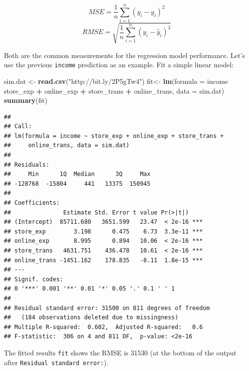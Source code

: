 \documentclass[12pt,]{krantz}
\makeatletter
\newenvironment{Shaded}{\begin{snugshade}}{\end{snugshade}}
\newcommand{\DataTypeTok}[1]{\textcolor[rgb]{0.27,0.27,0.27}{#1}}
\newcommand{\KeywordTok}[1]{\textcolor[rgb]{0.27,0.27,0.27}{\textbf{#1}}}
\newcommand{\NormalTok}[1]{#1}
\newcommand{\OperatorTok}[1]{\textcolor[rgb]{0.43,0.43,0.43}{\textbf{#1}}}
\newcommand{\StringTok}[1]{\textcolor[rgb]{0.5,0.5,0.5}{#1}}
\newenvironment{kframe}{%
\medskip{}
\setlength{\fboxsep}{.8em}
 \def\at@end@of@kframe{}%
 \ifinner\ifhmode%
  \def\at@end@of@kframe{\end{minipage}}%
  \begin{minipage}{\columnwidth}%
 \fi\fi%
 \def\FrameCommand##1{\hskip\@totalleftmargin \hskip-\fboxsep
 \colorbox{shadecolor}{##1}\hskip-\fboxsep
     \hskip-\linewidth \hskip-\@totalleftmargin \hskip\columnwidth}%
 \MakeFramed {\advance\hsize-\width
   \@totalleftmargin\z@ \linewidth\hsize
   \@setminipage}}%
 {\par\unskip\endMakeFramed%
 \at@end@of@kframe}
\renewenvironment{Shaded}{\begin{kframe}}{\end{kframe}}
\makeatother
\begin{document}
\[MSE=\frac{1}{n}\sum_{i=1}^{n}(y_{i}-\hat{y}_{i})^{2}\]
\[RMSE=\sqrt{\frac{1}{n}\sum_{i=1}^{n}(y_{i}-\hat{y}_{i})^{2}}\]

Both are the common measurements for the regression model performance. Let's use the previous \texttt{income} prediction as an example. Fit a simple linear model:

\begin{Shaded}
\begin{Highlighting}[]
\NormalTok{sim.dat <-}\StringTok{ }\KeywordTok{read.csv}\NormalTok{(}\StringTok{"http://bit.ly/2P5gTw4"}\NormalTok{)}
\NormalTok{fit<-}\StringTok{ }\KeywordTok{lm}\NormalTok{(}\DataTypeTok{formula =}\NormalTok{ income }\OperatorTok{~}\StringTok{ }\NormalTok{store_exp }\OperatorTok{+}\StringTok{ }\NormalTok{online_exp }\OperatorTok{+}\StringTok{ }\NormalTok{store_trans }\OperatorTok{+}\StringTok{ }
\StringTok{    }\NormalTok{online_trans, }\DataTypeTok{data =}\NormalTok{ sim.dat)}
\KeywordTok{summary}\NormalTok{(fit)}
\end{Highlighting}
\end{Shaded}

\begin{verbatim}
## 
## Call:
## lm(formula = income ~ store_exp + online_exp + store_trans + 
##     online_trans, data = sim.dat)
## 
## Residuals:
##     Min      1Q  Median      3Q     Max 
## -128768  -15804     441   13375  150945 
## 
## Coefficients:
##               Estimate Std. Error t value Pr(>|t|)    
## (Intercept)  85711.680   3651.599   23.47  < 2e-16 ***
## store_exp        3.198      0.475    6.73  3.3e-11 ***
## online_exp       8.995      0.894   10.06  < 2e-16 ***
## store_trans   4631.751    436.478   10.61  < 2e-16 ***
## online_trans -1451.162    178.835   -8.11  1.8e-15 ***
## ---
## Signif. codes:  
## 0 '***' 0.001 '**' 0.01 '*' 0.05 '.' 0.1 ' ' 1
## 
## Residual standard error: 31500 on 811 degrees of freedom
##   (184 observations deleted due to missingness)
## Multiple R-squared:  0.602,	Adjusted R-squared:   0.6 
## F-statistic:  306 on 4 and 811 DF,  p-value: <2e-16
\end{verbatim}

The fitted results \texttt{fit} shows the RMSE is 31530 (at the bottom of the output after \texttt{Residual\ standard\ error:}).
\end{document}
